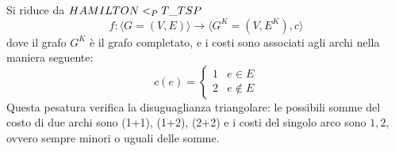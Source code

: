 Si riduce da $HAMILTON <_P T\_TSP$
\begin{equation*}
    f :
    \langle
        G = (V,E)
    \rangle
    \to
    \langle
        G^K = (V,E^K), c
    \rangle
\end{equation*}
dove il grafo $G^K$ è il grafo completato, e i costi sono associati agli archi nella maniera seguente:
\begin{equation*}
     c(e) = 
    \begin{cases}
        1 & e \in E \\
        2 & e \notin E
    \end{cases}
\end{equation*}
Questa pesatura verifica la disuguaglianza triangolare: le possibili somme del costo di due archi sono
(1+1),
(1+2),
(2+2)
e i costi del singolo arco sono $
1,2
$, ovvero sempre minori o uguali delle somme.


